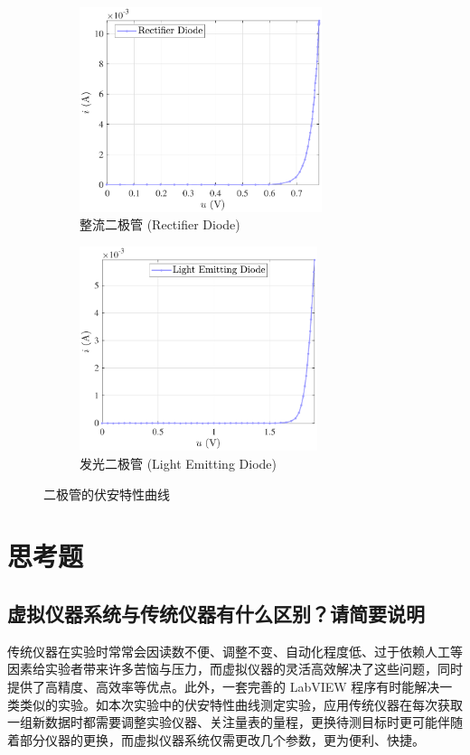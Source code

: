 \documentclass[UTF8]{article}
\theoremstyle{MyLineTheoremStyle} %
\theoremstyle{MyBlockTheoremStyle} %
\theoremstyle{MySubsubsectionStyle} %
\begin{document}
\begin{figure}[H]\centering
\begin{subfigure}[b]{0.5\columnwidth}\centering
    \includegraphics[height=170pt]{assets/整流二极管.pdf}
    \caption{ 整流二极管 (Rectifier Diode) }
\end{subfigure}\hfill
\begin{subfigure}[b]{0.5\columnwidth}\centering
    \includegraphics[height=170pt]{assets/发光二极管.pdf}
    \caption{ 发光二极管 (Light Emitting Diode) }
\end{subfigure}
\caption{二极管的伏安特性曲线}
\label{二极管}
\end{figure}

\section{思考题}

\subsection{虚拟仪器系统与传统仪器有什么区别？请简要说明}

传统仪器在实验时常常会因读数不便、调整不变、自动化程度低、过于依赖人工等因素给实验者带来许多苦恼与压力，而虚拟仪器的灵活高效解决了这些问题，同时提供了高精度、高效率等优点。此外，一套完善的 LabVIEW 程序有时能解决一类类似的实验。如本次实验中的伏安特性曲线测定实验，应用传统仪器在每次获取一组新数据时都需要调整实验仪器、关注量表的量程，更换待测目标时更可能伴随着部分仪器的更换，而虚拟仪器系统仅需更改几个参数，更为便利、快捷。
\end{document}
